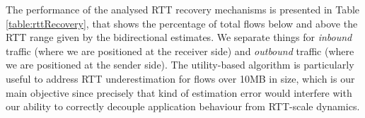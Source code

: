 The performance of the analysed \ac{RTT} recovery mechanisms is presented in Table \ref{table:rttRecovery}, that shows the percentage of total flows below and above the \ac{RTT} range given by the bidirectional estimates.
We separate things for \emph{inbound} traffic (where we are positioned at the receiver side) and \emph{outbound} traffic (where we are positioned at the sender side). 
The utility-based algorithm is particularly useful to address \ac{RTT} underestimation for flows over 10MB in size, which is our main objective since precisely that kind of estimation error would interfere with our ability to correctly decouple application behaviour from \ac{RTT}-scale dynamics.



